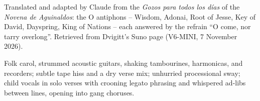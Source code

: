 
\label{sec:o-come}
\begin{notes}
Translated and adapted by Claude from the \emph{Gozos para todos los días} of the \emph{Novena de Aguinaldos}: the O antiphons -- Wisdom, Adonai, Root of Jesse, Key of David, Dayspring, King of Nations -- each answered by the refrain ``O come, nor tarry overlong''. Retrieved from Dvigitt's Suno page (V6-MINI, 7 November 2026).
\end{notes}
\begin{style}
Folk carol, strummed acoustic guitars, shaking tambourines, harmonicas, and recorders; subtle tape hiss and a dry verse mix; unhurried processional sway; child vocals in solo verses with crooning legato phrasing and whispered ad-libs between lines, opening into gang choruses.
\end{style}
